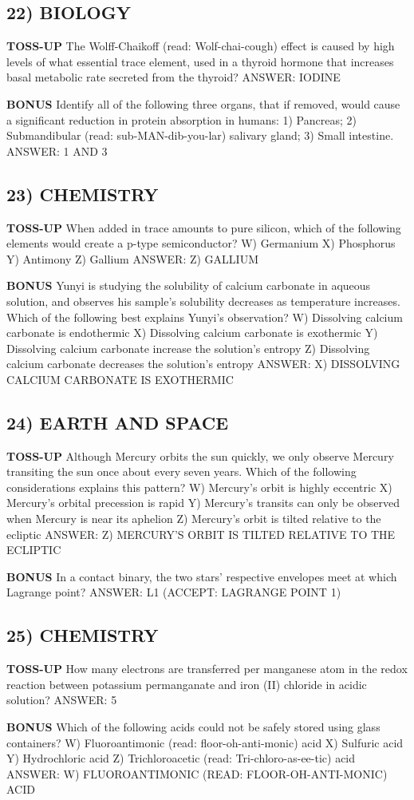 \documentclass{article}
\begin{document}
\subsection*{22) BIOLOGY}
\textbf{TOSS-UP}
The Wolff-Chaikoff (read: Wolf-chai-cough) effect is caused by high levels of what essential trace element, used in a thyroid hormone that increases basal metabolic rate secreted from the thyroid?
ANSWER: IODINE

\textbf{BONUS}
Identify all of the following three organs, that if removed, would cause a significant reduction in protein absorption in humans: 1) Pancreas; 2) Submandibular (read: sub-MAN-dib-you-lar) salivary gland; 3) Small intestine.
ANSWER: 1 AND 3

\subsection*{23) CHEMISTRY}
\textbf{TOSS-UP}
When added in trace amounts to pure silicon, which of the following elements would create a p-type semiconductor?
W) Germanium
X) Phosphorus
Y) Antimony
Z) Gallium
ANSWER: Z) GALLIUM

\textbf{BONUS}
Yunyi is studying the solubility of calcium carbonate in aqueous solution, and observes his sample's solubility decreases as temperature increases. Which of the following best explains Yunyi's observation?
W) Dissolving calcium carbonate is endothermic
X) Dissolving calcium carbonate is exothermic
Y) Dissolving calcium carbonate increase the solution's entropy
Z) Dissolving calcium carbonate decreases the solution's entropy
ANSWER: X) DISSOLVING CALCIUM CARBONATE IS EXOTHERMIC

\subsection*{24) EARTH AND SPACE}
\textbf{TOSS-UP}
Although Mercury orbits the sun quickly, we only observe Mercury transiting the sun once about every seven years. Which of the following considerations explains this pattern?
W) Mercury's orbit is highly eccentric
X) Mercury's orbital precession is rapid
Y) Mercury's transits can only be observed when Mercury is near its aphelion
Z) Mercury's orbit is tilted relative to the ecliptic
ANSWER: Z) MERCURY'S ORBIT IS TILTED RELATIVE TO THE ECLIPTIC

\textbf{BONUS}
In a contact binary, the two stars' respective envelopes meet at which Lagrange point?
ANSWER: L1 (ACCEPT: LAGRANGE POINT 1)

\subsection*{25) CHEMISTRY}
\textbf{TOSS-UP}
How many electrons are transferred per manganese atom in the redox reaction between potassium permanganate and iron (II) chloride in acidic solution?
ANSWER: 5

\textbf{BONUS}
Which of the following acids could not be safely stored using glass containers?
W) Fluoroantimonic (read: floor-oh-anti-monic) acid
X) Sulfuric acid
Y) Hydrochloric acid
Z) Trichloroacetic (read: Tri-chloro-as-ee-tic) acid
ANSWER: W) FLUOROANTIMONIC (READ: FLOOR-OH-ANTI-MONIC) ACID
\end{document}
